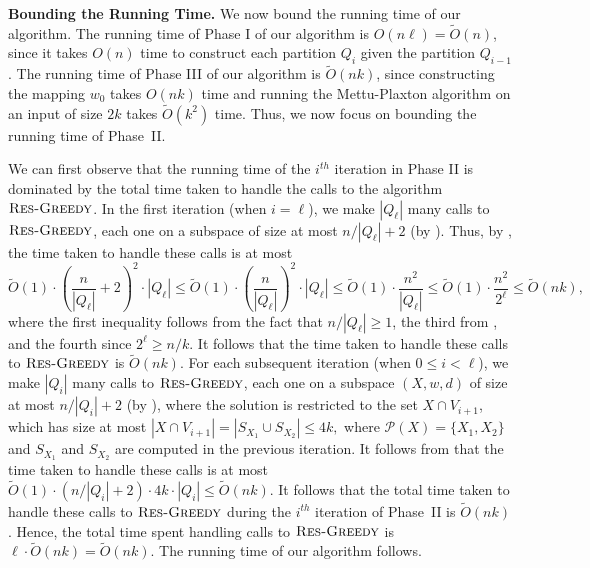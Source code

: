 \documentclass[11pt]{article}
\newcommand{\1}{\mathmybb{1}}
\newcommand{\Restr}{\textnormal{\textsc{Res-Greedy}}}
\newcommand{\calP}[0]{\mathcal{P}}
\begin{document}
\medskip
\noindent \textbf{Bounding the Running Time.}
We now bound the running time of our algorithm.
The running time of Phase I of our algorithm is $O(n \ell) = \tilde O(n)$, since it takes $O(n)$ time to construct each partition $Q_i$ given the partition $Q_{i-1}$. The running time of Phase III of our algorithm is $\tilde O(nk)$, since constructing the mapping $w_0$ takes $O(nk)$ time and running the Mettu-Plaxton algorithm on an input of size $2k$ takes $\tilde O(k^2)$ time.
Thus, we now focus on bounding the running time of Phase~II.

We can first observe that the running time of the $i^{th}$ iteration in Phase II is dominated by the total time taken to handle the calls to the algorithm $\Restr$.
In the first iteration (when $i = \ell$), we make $|Q_\ell|$ many calls to $\Restr$, each one on a subspace of size at most $n/|Q_\ell| + 2$ (by ). Thus, by , the time taken to handle these calls is at most
\begin{equation*}
\tilde O(1) \cdot \left(\frac{n}{|Q_\ell|} + 2\right)^2 \cdot |Q_\ell| 
\leq \tilde O(1) \cdot  \left(\frac{n}{|Q_\ell|}\right)^2 \cdot |Q_\ell| 
\leq \tilde O(1) \cdot  \frac{n^2}{|Q_\ell|} 
\leq \tilde O(1) \cdot \frac{n^2}{2^\ell} 
\leq \tilde O(nk),
\end{equation*}
where the first inequality follows from the fact that $n/|Q_\ell| \geq 1$, the third from , and the fourth since $2^\ell \geq n/k$.
It follows that the time taken to handle these calls to $\Restr$ is $\tilde O(nk)$.
For each subsequent iteration (when $0 \leq i < \ell$), we make $|Q_i|$ many calls to $\Restr$,
each one on a subspace $(X,w,d)$ of size at most $n/|Q_i| + 2$ (by ), where the solution is restricted to the set $X \cap V_{i+1}$, which has size at most
$ |X \cap V_{i+1}| = |S_{X_1} \cup S_{X_2}| \leq 4k, $
where $\calP(X) = \{X_1, X_2\}$ and $S_{X_1}$ and $S_{X_2}$ are computed in the previous iteration.
It follows from  that the time taken to handle these calls is at most
$ \tilde O(1) \cdot (n/|Q_i| + 2) \cdot 4k \cdot |Q_i| \leq \tilde O(nk)$.
It follows that the total time taken to handle these calls to $\Restr$ during the $i^{th}$ iteration of Phase~II is $\tilde O(nk)$.
Hence, the total time spent handling calls to $\Restr$ is $\ell \cdot \tilde O(nk) = \tilde O(nk)$. The running time of our algorithm follows.
 



\end{document}
